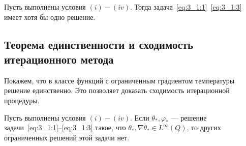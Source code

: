 \begin{theorem}
    \label{th:3_1:1}
    Пусть выполнены условия $(i)-(iv)$.
    Тогда задача~\eqref{eq:3_1:1}~\eqref{eq:3_1:3} имеет хотя бы одно решение.
\end{theorem}

\subsection{Теорема единственности и сходимость итерационного метода}
\label{subsec:ch3/sec1/uniqeness_convergense}
Покажем, что в классе функций с ограниченным градиентом температуры решение единственно.
Это позволяет доказать сходимость итерационной процедуры.

\begin{theorem}
    \label{th:3_1:2}
    Пусть выполнены условия $(i)-(iv)$.
    Если $\theta_{*}, \varphi_{*}$ — решение
    задачи~\eqref{eq:3_1:1}--\eqref{eq:3_1:3} такое,
    что $\theta_{*}, \nabla \theta_{*} \in L^{\infty }(Q)$,
    то других ограниченных решений этой задачи нет.
\end{theorem}

